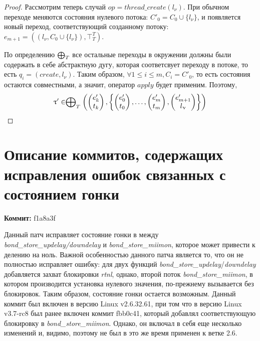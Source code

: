 \begin{proof}
Рассмотрим теперь случай $op = thread\_create(l_{\nu})$.
При обычном переходе меняются состояния нулевого потока: $C'_0 = C_0 \cup \{l_{\nu}\}$, и появляется новый переход, соответствующий созданному потоку: $e_{m+1} = ((l_{\nu},C_0 \cup \{l_{\nu}\}) , \top^T_T)$.

По определению $\mathrel{\bigoplus}_T$ все остальные переходы в окружении должны были содержать в себе абстрактную дугу, которая соответсвует переходу в потоке, то есть $q_i = (create, l_{\nu})$.
Таким образом, $\forall 1 \le i \le m, C_i = C'_0$, то есть состояния остаются совместными, а значит, оператор $apply$ будет применим.
Поэтому, 
$$\uptau' \in  \mathrel{\bigoplus}_{T}
\left(
\begin{pmatrix}
e'_k \\
t_k 
\end{pmatrix},
\left\{
\begin{pmatrix}
e'_0 \\
t_0 
\end{pmatrix},
\dots ,
\begin{pmatrix}
e'_m \\
t_m 
\end{pmatrix} ,
\begin{pmatrix}
e'_{m+1} \\
l_{\upnu} 
\end{pmatrix}
\right\}
\right)$$

\end{proof}


\section{Описание коммитов, содержащих исправления ошибок связанных с состоянием гонки}
\label{sect_commits_desc}

\textbf{Коммит:} f1a8a3f

Данный патч исправляет состояние гонки в между \textit{bond\_store\_updelay/downdelay}
и \textit{bond\_store\_miimon}, которое может привести к делению на ноль.
Важной особенностью данного патча является то, что он не полностью исправляет ошибку: для двух функций \textit{bond\_store\_updelay}/\textit{downdelay} добавляется захват блокировки \textit{rtnl}, однако, второй поток \textit{bond\_store\_miimon}, в котором производится установка нулевого значения, по-прежнему вызывается без блокировок.
Таким образом, состояние гонки остается возможным.
Данный коммит был включен в версию Linux v2.6.32.61, при том что в версию Linux v3.7-rc8 был ранее включен коммит fbb0c41, который добавлял соответствующую блокировку в \textit{bond\_store\_miimon}.
Однако, он включал в себя еще несколько изменений и, видимо, поэтому не был в это же время применен к ветке 2.6.

